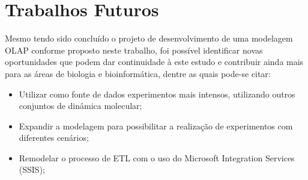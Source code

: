 \chapter{Trabalhos Futuros}
	Mesmo tendo sido concluído o projeto de desenvolvimento de uma modelagem OLAP conforme proposto neste trabalho, foi possível identificar novas oportunidades que podem dar continuidade à este estudo e contribuir ainda mais para as áreas de biologia e bioinformática, dentre as quais pode-se citar:

\begin{itemize}
 	\item Utilizar como fonte de dados experimentos mais intensos, utilizando outros conjuntos de dinâmica molecular;
 	\item Expandir a modelagem para possibilitar a realização de experimentos com diferentes cenários;
 	\item Remodelar o processo de ETL com o uso do Microsoft Integration Services (SSIS);
\end{itemize}
